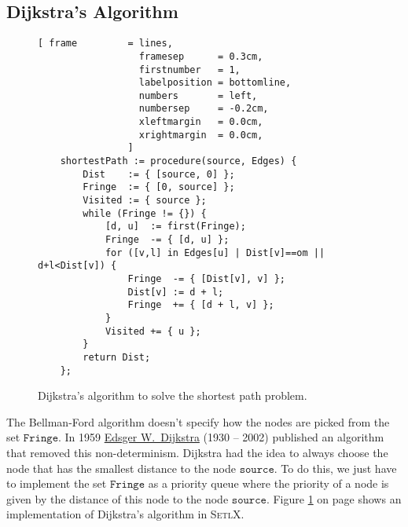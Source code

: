 \subsection{Dijkstra's Algorithm}
\begin{figure}[!ht]
\centering
\begin{Verbatim}[ frame         = lines, 
                  framesep      = 0.3cm, 
                  firstnumber   = 1,
                  labelposition = bottomline,
                  numbers       = left,
                  numbersep     = -0.2cm,
                  xleftmargin   = 0.0cm,
                  xrightmargin  = 0.0cm,
                ]
    shortestPath := procedure(source, Edges) {
        Dist    := { [source, 0] };
        Fringe  := { [0, source] };
        Visited := { source };
        while (Fringe != {}) {
            [d, u]  := first(Fringe);
            Fringe  -= { [d, u] };
            for ([v,l] in Edges[u] | Dist[v]==om || d+l<Dist[v]) {
                Fringe  -= { [Dist[v], v] };
                Dist[v] := d + l;
                Fringe  += { [d + l, v] };
            }
            Visited += { u };
        }
        return Dist;
    };
\end{Verbatim}
\vspace*{-0.3cm}
\caption{Dijkstra's algorithm to solve the shortest path problem.}
\label{fig:dijkstra.stlx}
\end{figure}

\noindent
The Bellman-Ford algorithm doesn't specify how the nodes are picked from the set $\mathtt{Fringe}$.
In 1959 \href{https://en.wikipedia.org/wiki/Edsger_W._Dijkstra}{Edsger W.~Dijkstra} (1930 -- 2002) \cite{dijkstra:59}
published an algorithm that removed this non-determinism.  Dijkstra had the idea to always choose
the node that has the smallest distance to the node $\mathtt{source}$.  To do this, we just have to
implement the set  $\mathtt{Fringe}$ as a priority queue where the priority of a node is given by the
distance of this node to the node $\mathtt{source}$.  Figure \ref{fig:dijkstra.stlx} on page
\pageref{fig:dijkstra.stlx} shows an implementation of Dijkstra's algorithm in \textsc{SetlX}.

